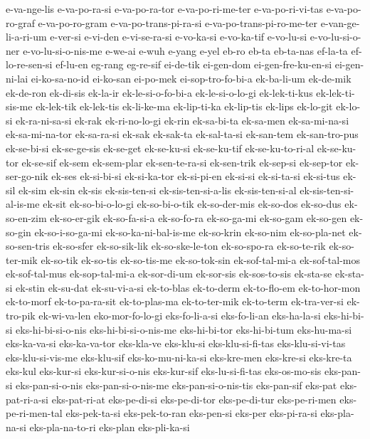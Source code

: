 {e-va-nge-lis e-va-po-ra-si e-va-po-ra-tor e-va-po-ri-me-ter
e-va-po-ri-vi-tas e-va-po-ro-graf e-va-po-ro-gram e-va-po-trans-pi-ra-si
e-va-po-trans-pi-ro-me-ter e-van-ge-li-a-ri-um e-ver-si e-vi-den
e-vi-se-ra-si e-vo-ka-si e-vo-ka-tif e-vo-lu-si e-vo-lu-si-o-ner
e-vo-lu-si-o-nis-me e-we-ai e-wuh e-yang e-yel eb-ro eb-ta eb-ta-nas
ef-la-ta ef-lo-re-sen-si ef-lu-en eg-rang eg-re-sif ei-de-tik ei-gen-dom
ei-gen-fre-ku-en-si ei-gen-ni-lai ei-ko-sa-no-id ei-ko-san ei-po-mek
ei-sop-tro-fo-bi-a ek-ba-li-um ek-de-mik ek-de-ron ek-di-sis ek-la-ir
ek-le-si-o-fo-bi-a ek-le-si-o-lo-gi ek-lek-ti-kus ek-lek-ti-sis-me
ek-lek-tik ek-lek-tis ek-li-ke-ma ek-lip-ti-ka ek-lip-tis ek-lips
ek-lo-git ek-lo-si ek-ra-ni-sa-si ek-rak ek-ri-no-lo-gi ek-rin ek-sa-bi-ta
ek-sa-men ek-sa-mi-na-si ek-sa-mi-na-tor ek-sa-ra-si ek-sak ek-sak-ta
ek-sal-ta-si ek-san-tem ek-san-tro-pus ek-se-bi-si ek-se-ge-sis ek-se-get
ek-se-ku-si ek-se-ku-tif ek-se-ku-to-ri-al ek-se-ku-tor ek-se-sif ek-sem
ek-sem-plar ek-sen-te-ra-si ek-sen-trik ek-sep-si ek-sep-tor ek-ser-go-nik
ek-ses ek-si-bi-si ek-si-ka-tor ek-si-pi-en ek-si-si ek-si-ta-si ek-si-tus
ek-sil ek-sim ek-sin ek-sis ek-sis-ten-si ek-sis-ten-si-a-lis
ek-sis-ten-si-al ek-sis-ten-si-al-is-me ek-sit ek-so-bi-o-lo-gi
ek-so-bi-o-tik ek-so-der-mis ek-so-dos ek-so-dus ek-so-en-zim ek-so-er-gik
ek-so-fa-si-a ek-so-fo-ra ek-so-ga-mi ek-so-gam ek-so-gen ek-so-gin
ek-so-i-so-ga-mi ek-so-ka-ni-bal-is-me ek-so-krin ek-so-nim ek-so-pla-net
ek-so-sen-tris ek-so-sfer ek-so-sik-lik ek-so-ske-le-ton ek-so-spo-ra
ek-so-te-rik ek-so-ter-mik ek-so-tik ek-so-tis ek-so-tis-me ek-so-tok-sin
ek-sof-tal-mi-a ek-sof-tal-mos ek-sof-tal-mus ek-sop-tal-mi-a ek-sor-di-um
ek-sor-sis ek-sos-to-sis ek-sta-se ek-sta-si ek-stin ek-su-dat
ek-su-vi-a-si ek-to-blas ek-to-derm ek-to-flo-em ek-to-hor-mon ek-to-morf
ek-to-pa-ra-sit ek-to-plas-ma ek-to-ter-mik ek-to-term ek-tra-ver-si
ek-tro-pik ek-wi-va-len eko-mor-fo-lo-gi eks-fo-li-a-si eks-fo-li-an
eks-ha-la-si eks-hi-bi-si eks-hi-bi-si-o-nis eks-hi-bi-si-o-nis-me
eks-hi-bi-tor eks-hi-bi-tum eks-hu-ma-si eks-ka-va-si eks-ka-va-tor
eks-kla-ve eks-klu-si eks-klu-si-fi-tas eks-klu-si-vi-tas
eks-klu-si-vis-me eks-klu-sif eks-ko-mu-ni-ka-si eks-kre-men eks-kre-si
eks-kre-ta eks-kul eks-kur-si eks-kur-si-o-nis eks-kur-sif
eks-lu-si-fi-tas eks-os-mo-sis eks-pan-si eks-pan-si-o-nis
eks-pan-si-o-nis-me eks-pan-si-o-nis-tis eks-pan-sif eks-pat
eks-pat-ri-a-si eks-pat-ri-at eks-pe-di-si eks-pe-di-tor eks-pe-di-tur
eks-pe-ri-men eks-pe-ri-men-tal eks-pek-ta-si eks-pek-to-ran eks-pen-si
eks-per eks-pi-ra-si eks-pla-na-si eks-pla-na-to-ri eks-plan eks-pli-ka-si
}
